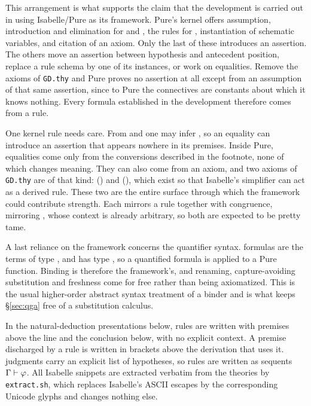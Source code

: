 \documentclass[11pt]{article}
\begin{document}
This arrangement is what supports the claim that the development is carried out
in \QGA{} using Isabelle/Pure as its framework.  Pure's kernel offers assumption, introduction
and elimination for  and , the rules for , instantiation of
schematic variables, and citation of an axiom.  Only the last of these introduces
an assertion.  The others move an assertion between hypothesis and antecedent
position, replace a rule schema by one of its instances, or work on equalities.
Remove the axioms of \texttt{GD.thy} and Pure proves no assertion at all except
from an assumption of that same assertion, since to Pure the \QGA{} connectives
are constants about which it knows nothing.  Every \QGA{} formula established in
the development therefore comes from a \QGA{} rule. 

One kernel rule needs care.  From  and  one may infer ,
so an equality can introduce an assertion that appears nowhere in its premises.
Inside Pure, equalities come only from the conversions described in the footnote, none of which changes meaning.  They can also come from an axiom, and two
axioms of \texttt{GD.thy} are of that kind: 
() and  (), which
exist so that Isabelle's simplifier can act as a derived rule.  These two are the
entire surface through which the framework could contribute strength.  Each
mirrors a \QGA{} rule together with congruence,  mirroring
, whose context  is already arbitrary, so both are
expected to be pretty tame. 

A last reliance on the framework concerns the quantifier syntax.  \QGA{}
formulas are the terms of type , and  has type
, so a quantified formula is  applied to a Pure
function.  Binding is therefore the framework's, and renaming, capture-avoiding
substitution and freshness come for free rather than being axiomatized.  This is
the usual higher-order abstract syntax treatment of a binder and is what keeps
\S\ref{sec:qga} free of a substitution calculus. 

In the natural-deduction presentations below, \QGA{} rules are written with
premises above the line and the conclusion below, with no explicit context.  A
premise discharged by a rule is written in brackets above the derivation that
uses it.  \BGA{} judgments carry an explicit list of hypotheses, so \BGA{} rules
are written as sequents $\Gamma \vdash \varphi$.  All Isabelle snippets are
extracted verbatim from the theories by \texttt{extract.sh}, which replaces
Isabelle's ASCII escapes by the corresponding Unicode glyphs and changes nothing
else.
\end{document}
